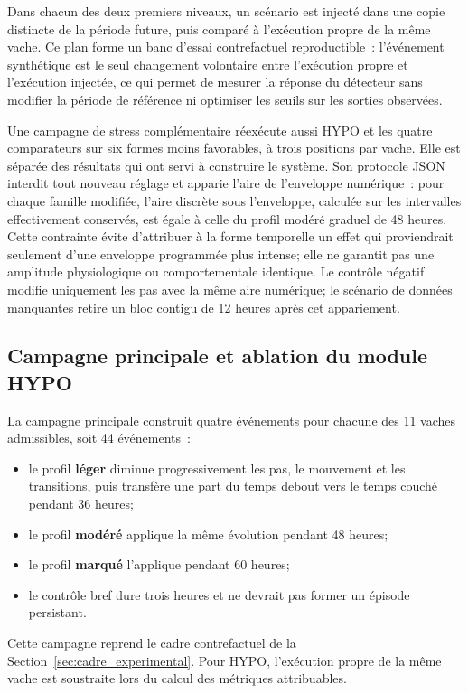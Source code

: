 Dans chacun des deux premiers niveaux, un scénario est injecté dans une copie distincte de la
période future, puis comparé à l'exécution propre de la même vache. Ce plan forme un banc
d'essai contrefactuel reproductible~: l'événement synthétique est le seul changement
volontaire entre l'exécution propre et l'exécution injectée, ce qui permet de mesurer la
réponse du détecteur sans modifier la période de référence ni optimiser les seuils sur les
sorties observées.

Une campagne de stress complémentaire réexécute aussi HYPO et les quatre comparateurs sur
six formes moins favorables, à trois positions par vache. Elle est séparée des résultats qui
ont servi à construire le système. Son protocole JSON interdit tout nouveau réglage et
apparie l'aire de l'enveloppe numérique~: pour chaque famille modifiée, l'aire discrète sous
l'enveloppe, calculée sur les intervalles effectivement conservés, est égale à celle du
profil modéré graduel de 48 heures. Cette contrainte évite d'attribuer à la forme temporelle
un effet qui proviendrait seulement d'une enveloppe programmée plus intense; elle ne garantit
pas une amplitude physiologique ou comportementale identique. Le contrôle négatif modifie
uniquement les pas avec la même aire numérique; le scénario de données manquantes retire un
bloc contigu de 12 heures après cet appariement.

\subsection{Campagne principale et ablation du module HYPO}
La campagne principale construit quatre événements pour chacune des 11 vaches admissibles,
soit 44 événements~:
\begin{itemize}
  \item le profil \textbf{léger} diminue progressivement les pas, le mouvement et les
  transitions, puis transfère une part du temps debout vers le temps couché pendant 36 heures;
  \item le profil \textbf{modéré} applique la même évolution pendant 48 heures;
  \item le profil \textbf{marqué} l'applique pendant 60 heures;
  \item le contrôle bref dure trois heures et ne devrait pas former un épisode persistant.
\end{itemize}
Cette campagne reprend le cadre contrefactuel de la Section~\ref{sec:cadre_experimental}.
Pour HYPO, l'exécution propre de la même vache est soustraite lors du calcul des métriques
attribuables.

